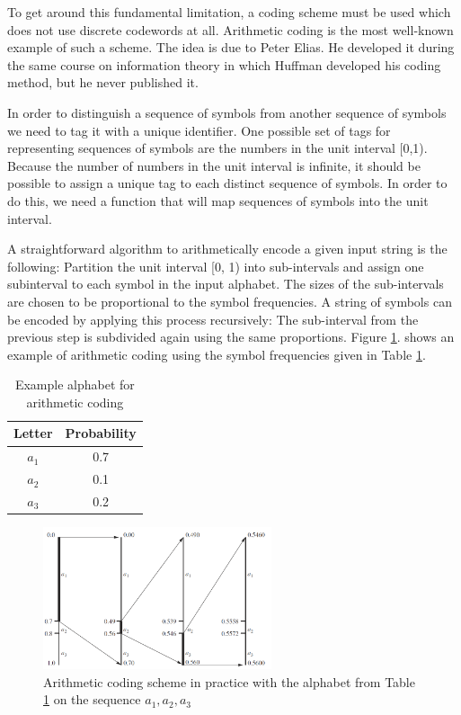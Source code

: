 \documentclass{diploma_style}
\begin{document}
To get around this fundamental limitation, a coding scheme must be used which does not use discrete codewords at all. Arithmetic coding is the most well-known example of such a scheme. The idea is due to Peter Elias. He developed it during the same course on information theory in which Huffman developed his coding method, but he never published it.

In order to distinguish a sequence of symbols from another sequence of symbols we need to
tag it with a unique identifier. One possible set of tags for representing sequences of symbols
are the numbers in the unit interval [0,1). Because the number of numbers in the unit interval
is infinite, it should be possible to assign a unique tag to each distinct sequence of symbols. In
order to do this, we need a function that will map sequences of symbols into the unit interval.

A straightforward algorithm to arithmetically encode a given input string is the
following: Partition the unit interval [0, 1) into sub-intervals and assign one subinterval
to each symbol in the input alphabet. The sizes of the sub-intervals are
chosen to be proportional to the symbol frequencies. A string of symbols can be
encoded by applying this process recursively: The sub-interval from the previous
step is subdivided again using the same proportions. Figure \ref{fig:arithmetic}. shows an example of
arithmetic coding using the symbol frequencies given in Table \ref{tab:arithmetic}.

\begin{table}
\caption{Example alphabet for arithmetic coding}
\centering
\begin{tabular}{cc}
\toprule
Letter & Probability \\
\midrule
$a_1$ & 0.7 \\
$a_2$ & 0.1 \\
$a_3$ & 0.2 \\
\bottomrule
\end{tabular}
\label{tab:arithmetic}
\end{table}

\begin{figure}
\centering
\includegraphics[width=0.6\textwidth]{figures/3_compression/arithmetic}
\caption{Arithmetic coding scheme in practice with the alphabet from Table \ref{tab:arithmetic} on the sequence $a_1,a_2,a_3$}
\label{fig:arithmetic}
\end{figure}
\end{document}
